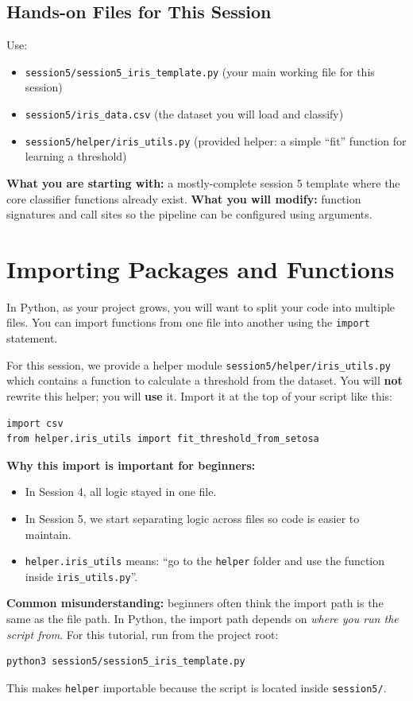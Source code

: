 \subsection{Hands-on Files for This Session}
Use:
\begin{itemize}
    \item \texttt{session5/session5\_iris\_template.py} (your main working file for this session)
    \item \texttt{session5/iris\_data.csv} (the dataset you will load and classify)
    \item \texttt{session5/helper/iris\_utils.py} (provided helper: a simple ``fit'' function for learning a threshold)
\end{itemize}
\noindent
\textbf{What you are starting with:} a mostly-complete session 5 template where the core classifier functions already exist.
\textbf{What you will modify:} function signatures and call sites so the pipeline can be configured using arguments.

\section{Importing Packages and Functions}
In Python, as your project grows, you will want to split your code into multiple files. You can import functions from one file into another using the \texttt{import} statement.

For this session, we provide a helper module \texttt{session5/helper/iris\_utils.py} which contains a function to calculate a threshold from the dataset.
You will \textbf{not} rewrite this helper; you will \textbf{use} it.
Import it at the top of your script like this:

\begin{verbatim}
import csv
from helper.iris_utils import fit_threshold_from_setosa
\end{verbatim}

\noindent
\textbf{Why this import is important for beginners:}
\begin{itemize}
    \item In Session 4, all logic stayed in one file.
    \item In Session 5, we start separating logic across files so code is easier to maintain.
    \item \texttt{helper.iris\_utils} means: ``go to the \texttt{helper} folder and use the function inside \texttt{iris\_utils.py}''.
\end{itemize}
\noindent
\textbf{Common misunderstanding:} beginners often think the import path is the same as the file path.
In Python, the import path depends on \textit{where you run the script from}.
For this tutorial, run from the project root:
\begin{verbatim}
python3 session5/session5_iris_template.py
\end{verbatim}
This makes \texttt{helper} importable because the script is located inside \texttt{session5/}.

